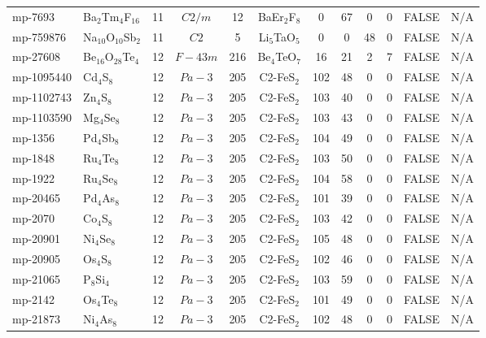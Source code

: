 {\begin{longtable}{llcccccccccc}
    mp-7693 & Ba$_{2}$Tm$_{4}$F$_{16}$ & 11    & $C2/m$ & 12    & BaEr$_{2}$F$_{8}$ & 0     & 67    & 0     & 0     & FALSE & N/A \\
    mp-759876 & Na$_{10}$O$_{10}$Sb$_{2}$ & 11    & $C2$  & 5     & Li$_{5}$TaO$_{5}$ & 0     & 0     & 48    & 0     & FALSE & N/A \\
    mp-27608 & Be$_{16}$O$_{28}$Te$_{4}$ & 12    & $F-43m$ & 216   & Be$_{4}$TeO$_{7}$ & 16    & 21    & 2     & 7     & FALSE & N/A \\
    mp-1095440 & Cd$_{4}$S$_{8}$ & 12    & $Pa-3$ & 205   & C2-FeS$_{2}$ & 102   & 48    & 0     & 0     & FALSE & N/A \\
    mp-1102743 & Zn$_{4}$S$_{8}$ & 12    & $Pa-3$ & 205   & C2-FeS$_{2}$ & 103   & 40    & 0     & 0     & FALSE & N/A \\
    mp-1103590 & Mg$_{4}$Se$_{8}$ & 12    & $Pa-3$ & 205   & C2-FeS$_{2}$ & 103   & 43    & 0     & 0     & FALSE & N/A \\
    mp-1356 & Pd$_{4}$Sb$_{8}$ & 12    & $Pa-3$ & 205   & C2-FeS$_{2}$ & 104   & 49    & 0     & 0     & FALSE & N/A \\
    mp-1848 & Ru$_{4}$Te$_{8}$ & 12    & $Pa-3$ & 205   & C2-FeS$_{2}$ & 103   & 50    & 0     & 0     & FALSE & N/A \\
    mp-1922 & Ru$_{4}$Se$_{8}$ & 12    & $Pa-3$ & 205   & C2-FeS$_{2}$ & 104   & 58    & 0     & 0     & FALSE & N/A \\
    mp-20465 & Pd$_{4}$As$_{8}$ & 12    & $Pa-3$ & 205   & C2-FeS$_{2}$ & 101   & 39    & 0     & 0     & FALSE & N/A \\
    mp-2070 & Co$_{4}$S$_{8}$ & 12    & $Pa-3$ & 205   & C2-FeS$_{2}$ & 103   & 42    & 0     & 0     & FALSE & N/A \\
    mp-20901 & Ni$_{4}$Se$_{8}$ & 12    & $Pa-3$ & 205   & C2-FeS$_{2}$ & 105   & 48    & 0     & 0     & FALSE & N/A \\
    mp-20905 & Os$_{4}$S$_{8}$ & 12    & $Pa-3$ & 205   & C2-FeS$_{2}$ & 102   & 46    & 0     & 0     & FALSE & N/A \\
    mp-21065 & P$_{8}$Si$_{4}$ & 12    & $Pa-3$ & 205   & C2-FeS$_{2}$ & 103   & 59    & 0     & 0     & FALSE & N/A \\
    mp-2142 & Os$_{4}$Te$_{8}$ & 12    & $Pa-3$ & 205   & C2-FeS$_{2}$ & 101   & 49    & 0     & 0     & FALSE & N/A \\
    mp-21873 & Ni$_{4}$As$_{8}$ & 12    & $Pa-3$ & 205   & C2-FeS$_{2}$ & 102   & 48    & 0     & 0     & FALSE & N/A \\

\end{longtable}}
